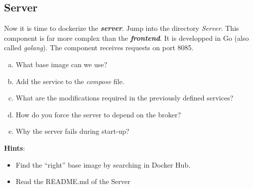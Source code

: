 \documentclass[a4paper,11pt]{exam}
\begin{document}
\subsection{Server}
	\begin{questions}

	\question Now it is time to dockerize the \textit{\textbf{server}}. Jump into the directory \textit{Server}. This component is far more complex than the \textit{\textbf{frontend}}. It is developped in Go (also called \textit{golang}). The component receives requests on port 8085.
	
	\begin{enumerate}[(a)] %
		\item What base image can we use?
		\item Add the service to the \textit{compose} file.
		\item What are the modifications required in the previously defined services?
		\item How do you force the server to depend on the broker?
		\item Why the server fails during start-up?
	\end{enumerate}
	
	\textbf{Hints}:
	\begin{itemize}
		\item Find the ``right'' base image by searching in Docker Hub.

		\item Read the README.md of the Server

	\end{itemize}
	\end{questions}
\end{document}

